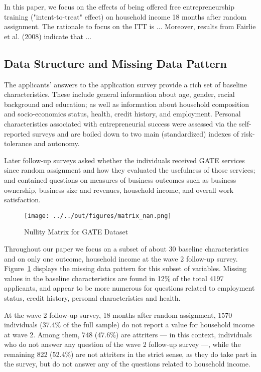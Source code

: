 In this paper, we focus on the effects of being offered free entrepreneurship training ("intent-to-treat" effect) on household income 18 months after random assignment. %
The rationale to focus on the ITT is ... %
Moreover, results from Fairlie et al. (2008) indicate that ... %

\subsection{Data Structure and Missing Data Pattern}

The applicants' answers to the application survey provide a rich set of baseline characteristics. These include general information about age, gender, racial background and education; as well as information about household composition and socio-economics status, health, credit history, and employment. Personal characteristics associated with entrepreneurial success were assessed via the self-reported surveys and are boiled down to two main (standardized) indexes of risk-tolerance and autonomy.

Later follow-up surveys asked whether the individuals received GATE services since random assignment and how they evaluated the usefulness of those services; and contained questions on measures of business outcomes such as business ownership, business size and revenues, household income, and overall work satisfaction.

\begin{figure}[t]
    \caption{Nullity Matrix for GATE Dataset}
    \texttt{[image: ../../out/figures/matrix\_nan.png]}
    \label{fig:matrix_nan}
\end{figure}

Throughout our paper we focus on a subset of about 30 baseline characteristics and on only one outcome, household income at the wave 2 follow-up survey. Figure~\ref{fig:matrix_nan} displays the missing data pattern for this subset of variables. Missing values in the baseline characteristics are found in 12\% of the total 4197 applicants, and appear to be more numerous for questions related to employment status, credit history, personal characteristics and health.

At the wave 2 follow-up survey, 18 months after random assignment, 1570 individuals (37.4\% of the full sample) do not report a value for household income at wave 2. Among them, 748 (47.6\%) are attriters --- in this context, individuals who do not answer any question of the wave 2 follow-up survey ---, while the remaining 822 (52.4\%) are not attriters in the strict sense, as they do take part in the survey, but do not answer any of the questions related to household income.

